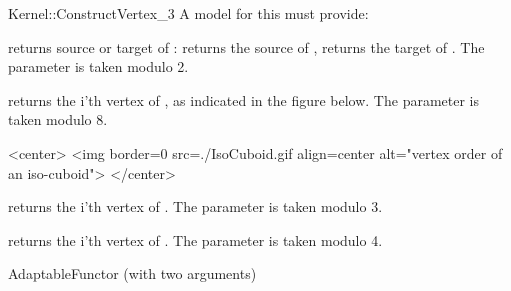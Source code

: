 \begin{ccRefFunctionObjectConcept}{Kernel::ConstructVertex_3}
A model for this must provide:


 {returns source or target of : \ccVar{}
  returns the source of , \ccVar{} returns the target
  of . The parameter  is taken modulo 2. }

 {returns the i'th vertex of
  , as indicated in the figure below. The parameter  is
  taken modulo 8. }

\begin{ccHtmlOnly}
<center>
<img border=0 src=./IsoCuboid.gif align=center alt="vertex order of an iso-cuboid">
</center>
\end{ccHtmlOnly} 

 {returns the i'th vertex of . The parameter
   is taken modulo 3.}

 {returns the i'th vertex of
  . The parameter  is taken modulo 4.}

\ccRefines
AdaptableFunctor (with two arguments)

\ccSeeAlso
{} \\
 \\
  \\
 \\

\end{ccRefFunctionObjectConcept}

